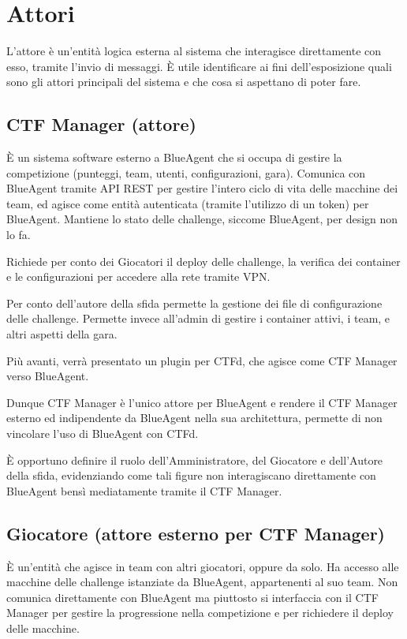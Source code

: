 \section{Attori}\label{attori}

L'attore è un'entità logica esterna al sistema che interagisce
direttamente con esso, tramite l'invio di messaggi. È utile identificare
ai fini dell'esposizione quali sono gli attori principali del sistema e
che cosa si aspettano di poter fare.

\subsection{CTF Manager (attore)}\label{ctf-manager-attore}

È un sistema software esterno a BlueAgent che si occupa di gestire la
competizione (punteggi, team, utenti, configurazioni, gara). Comunica
con BlueAgent tramite API REST per gestire l'intero ciclo di vita delle
macchine dei team, ed agisce come entità autenticata (tramite l'utilizzo
di un token) per BlueAgent. Mantiene lo stato delle challenge, siccome
BlueAgent, per design non lo fa.

Richiede per conto dei Giocatori il deploy delle challenge, la verifica
dei container e le configurazioni per accedere alla rete tramite VPN.

Per conto dell'autore della sfida permette la gestione dei file di
configurazione delle challenge. Permette invece all'admin di gestire i
container attivi, i team, e altri aspetti della gara.

Più avanti, verrà presentato un plugin per CTFd, che agisce come CTF
Manager verso BlueAgent.

Dunque CTF Manager è l'unico attore per BlueAgent e rendere il CTF
Manager esterno ed indipendente da BlueAgent nella sua architettura,
permette di non vincolare l'uso di BlueAgent con CTFd.

È opportuno definire il ruolo dell'Amministratore, del Giocatore e
dell'Autore della sfida, evidenziando come tali figure non interagiscano
direttamente con BlueAgent bensì mediatamente tramite il CTF Manager.

\subsection{Giocatore (attore esterno per CTF
Manager)}\label{giocatore-attore-esterno-per-ctf-manager}

È un'entità che agisce in team con altri giocatori, oppure da solo. Ha
accesso alle macchine delle challenge istanziate da BlueAgent,
appartenenti al suo team. Non comunica direttamente con BlueAgent ma
piuttosto si interfaccia con il CTF Manager per gestire la progressione
nella competizione e per richiedere il deploy delle macchine.

